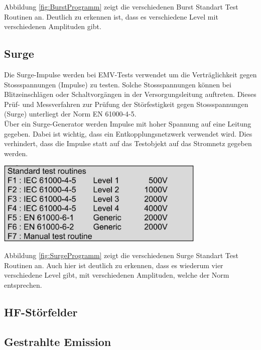 Abbildung \ref{fig:BurstProgramm} zeigt die verschiedenen Burst Standart Test Routinen an. Deutlich zu erkennen ist, dass es verschiedene Level mit verschiedenen Amplituden gibt.\\

\subsection{Surge}
Die Surge-Impulse werden bei EMV-Tests verwendet um die Verträglichkeit gegen Stossspannungen (Impulse) zu testen. Solche Stossspannungen können bei Blitzeinschlägen oder Schaltvorgängen in der Versorgungsleitung auftreten. Dieses Prüf- und Messverfahren zur Prüfung der Störfestigkeit gegen Stossspannungen (Surge) unterliegt der Norm EN 61000-4-5.\\[0.25cm]
Über ein Surge-Generator werden Impulse mit hoher Spannung auf eine Leitung gegeben. Dabei ist wichtig, dass ein Entkopplungsnetzwerk verwendet wird. Dies verhindert, dass die Impulse statt auf das Testobjekt auf das Stromnetz gegeben werden.\\

\begin{minipage}[b][6cm][t]{1\textwidth}
\centering
\includegraphics[angle=0,width=0.75\textwidth]{graphics/SurgeProgramm.jpg}
\label{fig:SurgeProgramm}
\end{minipage}

Abbildung \ref{fig:SurgeProgramm} zeigt die verschiedenen Surge Standart Test Routinen an. Auch hier ist deutlich zu erkennen, dass es wiederum vier verschiedene Level gibt, mit verschiedenen Amplituden, welche der Norm entsprechen.\\

\subsection{HF-Störfelder}

\subsection{Gestrahlte Emission}

